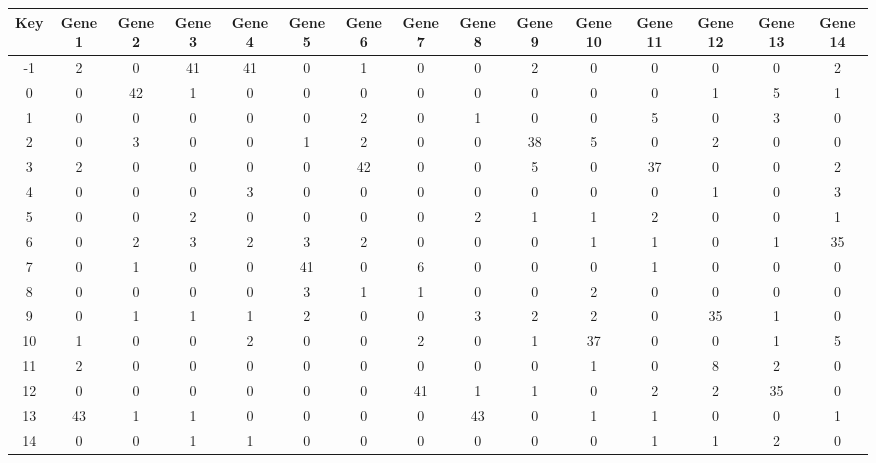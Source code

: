 \begin{tabular}{|c|c|c|c|c|c|c|c|c|c|c|c|c|c|c|}
\hline
Key & Gene 1 & Gene 2 & Gene 3 & Gene 4 & Gene 5 & Gene 6 & Gene 7 & Gene 8 & Gene 9 & Gene 10 & Gene 11 & Gene 12 & Gene 13 & Gene 14 \\
\hline
-1 & 2 & 0 & 41 & 41 & 0 & 1 & 0 & 0 & 2 & 0 & 0 & 0 & 0 & 2 \\
0 & 0 & 42 & 1 & 0 & 0 & 0 & 0 & 0 & 0 & 0 & 0 & 1 & 5 & 1 \\
1 & 0 & 0 & 0 & 0 & 0 & 2 & 0 & 1 & 0 & 0 & 5 & 0 & 3 & 0 \\
2 & 0 & 3 & 0 & 0 & 1 & 2 & 0 & 0 & 38 & 5 & 0 & 2 & 0 & 0 \\
3 & 2 & 0 & 0 & 0 & 0 & 42 & 0 & 0 & 5 & 0 & 37 & 0 & 0 & 2 \\
4 & 0 & 0 & 0 & 3 & 0 & 0 & 0 & 0 & 0 & 0 & 0 & 1 & 0 & 3 \\
5 & 0 & 0 & 2 & 0 & 0 & 0 & 0 & 2 & 1 & 1 & 2 & 0 & 0 & 1 \\
6 & 0 & 2 & 3 & 2 & 3 & 2 & 0 & 0 & 0 & 1 & 1 & 0 & 1 & 35 \\
7 & 0 & 1 & 0 & 0 & 41 & 0 & 6 & 0 & 0 & 0 & 1 & 0 & 0 & 0 \\
8 & 0 & 0 & 0 & 0 & 3 & 1 & 1 & 0 & 0 & 2 & 0 & 0 & 0 & 0 \\
9 & 0 & 1 & 1 & 1 & 2 & 0 & 0 & 3 & 2 & 2 & 0 & 35 & 1 & 0 \\
10 & 1 & 0 & 0 & 2 & 0 & 0 & 2 & 0 & 1 & 37 & 0 & 0 & 1 & 5 \\
11 & 2 & 0 & 0 & 0 & 0 & 0 & 0 & 0 & 0 & 1 & 0 & 8 & 2 & 0 \\
12 & 0 & 0 & 0 & 0 & 0 & 0 & 41 & 1 & 1 & 0 & 2 & 2 & 35 & 0 \\
13 & 43 & 1 & 1 & 0 & 0 & 0 & 0 & 43 & 0 & 1 & 1 & 0 & 0 & 1 \\
14 & 0 & 0 & 1 & 1 & 0 & 0 & 0 & 0 & 0 & 0 & 1 & 1 & 2 & 0 \\
\hline
\end{tabular}